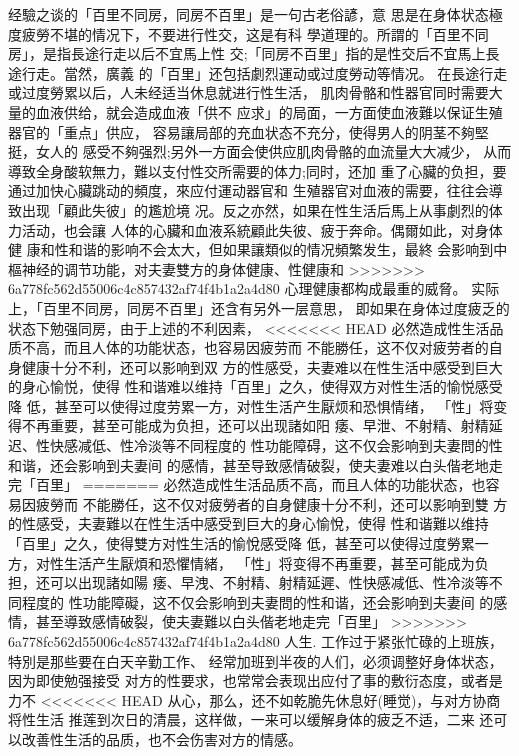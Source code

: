 \documentclass[12pt,UTF8]{ctexbook}
\begin{document}
经驗之谈的「百里不同房，同房不百里」是一句古老俗諺，意
思是在身体状态極度疲勞不堪的情况下，不要进行性交，这是有科
學道理的。所謂的「百里不同房」，是指長途行走以后不宜馬上性
交;「同房不百里」指的是性交后不宜馬上長途行走。當然，廣義
的「百里」还包括劇烈運动或过度勞动等情况。
在長途行走或过度勞累以后，人未经适当休息就进行性生活，
肌肉骨骼和性器官同时需要大量的血液供给，就会造成血液「供不
应求」的局面，一方面使血液難以保证生殖器官的「重点」供应，
容易讓局部的充血状态不充分，使得男人的阴茎不夠堅挺，女人的
感受不夠强烈;另外一方面会使供应肌肉骨骼的血流量大大减少，
从而導致全身酸软無力，難以支付性交所需要的体力;同时，还加
重了心臟的负担，要通过加快心臟跳动的頻度，來应付運动器官和
生殖器官对血液的需要，往往会導致出现「顧此失彼」的尷尬境
况。反之亦然，如果在性生活后馬上从事劇烈的体力活动，也会讓
人体的心臟和血液系統顧此失彼、疲于奔命。偶爾如此，对身体健
康和性和谐的影响不会太大，但如果讓類似的情况頻繁发生，最終
会影响到中樞神经的调节功能，对夫妻雙方的身体健康、性健康和
>>>>>>> 6a778fc562d55006c4c857432af74f4b1a2a4d80
心理健康都构成最重的威脅。
实际上，「百里不同房，同房不百里」还含有另外一层意思，
即如果在身体过度疲乏的状态下勉强同房，由于上述的不利因素，
<<<<<<< HEAD
必然造成性生活品质不高，而且人体的功能状态，也容易因疲劳而
不能勝任，这不仅对疲劳者的自身健康十分不利，还可以影响到双
方的性感受，夫妻难以在性生活中感受到巨大的身心愉悦，使得
性和谐难以维持「百里」之久，使得双方对性生活的愉悦感受降
低，甚至可以使得过度劳累一方，对性生活产生厭烦和恐惧情绪，
「性」将变得不再重要，甚至可能成为负担，还可以出现諸如阳
痿、早泄、不射精、射精延迟、性快感减低、性冷淡等不同程度的
性功能障碍，这不仅会影响到夫妻問的性和谐，还会影响到夫妻间
的感情，甚至导致感情破裂，使夫妻难以白头偕老地走完「百里」
=======
必然造成性生活品质不高，而且人体的功能状态，也容易因疲勞而
不能勝任，这不仅对疲勞者的自身健康十分不利，还可以影响到雙
方的性感受，夫妻難以在性生活中感受到巨大的身心愉悅，使得
性和谐難以维持「百里」之久，使得雙方对性生活的愉悅感受降
低，甚至可以使得过度勞累一方，对性生活产生厭煩和恐懼情緒，
「性」将变得不再重要，甚至可能成为负担，还可以出现諸如陽
痿、早洩、不射精、射精延遲、性快感减低、性冷淡等不同程度的
性功能障礙，这不仅会影响到夫妻問的性和谐，还会影响到夫妻间
的感情，甚至導致感情破裂，使夫妻難以白头偕老地走完「百里」
>>>>>>> 6a778fc562d55006c4c857432af74f4b1a2a4d80
人生.
工作过于紧张忙碌的上班族，特別是那些要在白天辛勤工作、
经常加班到半夜的人们，必须调整好身体状态，因为即使勉强接受
对方的性要求，也常常会表现出应付了事的敷衍态度，或者是力不
<<<<<<< HEAD
从心，那么，还不如乾脆先休息好(睡觉)，与对方协商将性生活
推莲到次日的清晨，这样做，一来可以缓解身体的疲乏不适，二来
还可以改善性生活的品质，也不会伤害对方的情感。
\end{document}
